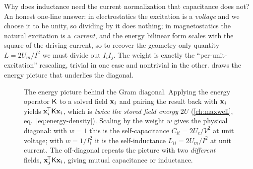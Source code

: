 Why does inductance need the current normalization that capacitance does not? An
honest one-line answer: in electrostatics the excitation is a \emph{voltage} and
we choose it to be unity, so dividing by it does nothing; in magnetostatics the
natural excitation is a \emph{current}, and the energy bilinear form scales with
the square of the driving current, so to recover the geometry-only quantity
$L=2U_m/I^2$ we must divide out $I_iI_j$. The weight is exactly the
``per-unit-excitation'' rescaling, trivial in one case and nontrivial in the
other.  draws the energy picture that underlies the
diagonal.

\begin{figure}[t]
\centering
{}
\caption[The Gram diagonal is field energy]{The energy picture behind the Gram
diagonal. Applying the energy operator $\mathsf{K}$ to a solved field $\mathbf{x}_i$ and
pairing the result back with $\mathbf{x}_i$ yields $\mathbf{x}_i^{\!\top}\mathsf{K}\mathbf{x}_i$, which is
\emph{twice the stored field energy} $2U$ (\cref{ch:maxwell},
eq.~\eqref{eq:energy-density}). Scaling by the weight $w$ gives the physical
diagonal: with $w=1$ this is the self-capacitance $C_{ii}=2U_e/V^2$ at unit
voltage; with $w=1/I_i^2$ it is the self-inductance $L_{ii}=2U_m/I^2$ at unit
current. The off-diagonal repeats the picture with two \emph{different} fields,
$\mathbf{x}_j^{\!\top}\mathsf{K}\mathbf{x}_i$, giving mutual capacitance or inductance.}
\label{fig:gram-energy}
\end{figure}

